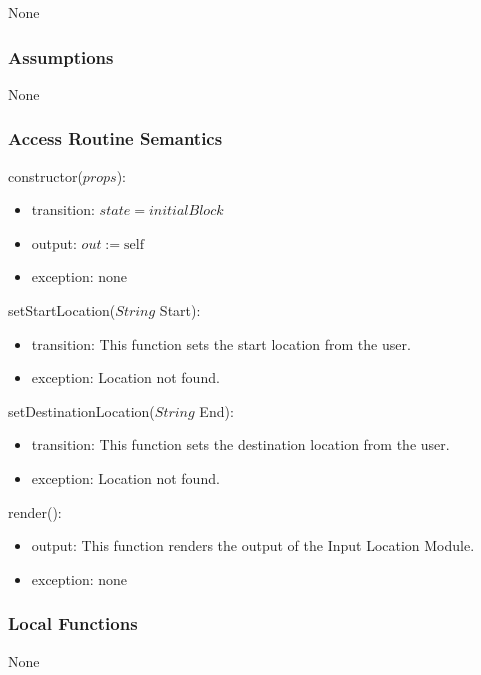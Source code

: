 \documentclass[12pt, titlepage]{article}
\begin{document}
None

\subsubsection{Assumptions}

None

\subsubsection{Access Routine Semantics}

\noindent constructor($props$):
\begin{itemize}
\item transition: $\mathit{state} = initialBlock$
\item output: $out := \mbox{self}$
\item exception: none
\end{itemize}

\noindent setStartLocation($String$ Start):
\begin{itemize}
\item transition: This function sets the start location from the user.
\item exception: Location not found.
\end{itemize}

\noindent setDestinationLocation($String$ End):
\begin{itemize}
\item transition: This function sets the destination location from the user.
\item exception: Location not found.
\end{itemize}

\noindent render():
\begin{itemize}
\item output: This function renders the output of the Input Location Module.
\item exception: none
\end{itemize}

\subsubsection{Local Functions}

None

\newpage



\end{document}

